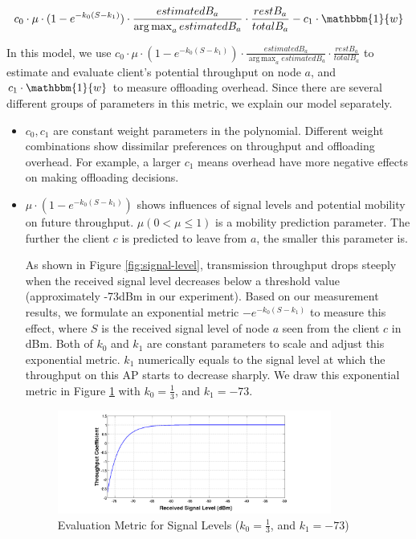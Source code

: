 \documentclass[english]{tktltiki}
\begin{document}
\begin{enumerate}
\begin{equation} \label{eq:offloading}
  c_0 \cdot \mu \cdot (1 - e^{-k_0(S - k_1)}) \cdot  \frac{estimatedB_a}{\operatorname*{arg\,max}_a estimatedB_a} \cdot \frac{restB_a}{totalB_a} - c_1 \cdot \mathbbm{1}{w}
\end{equation}

In this model, we use $c_0 \cdot \mu \cdot (1 - e^{-k_0(S - k_1)}) \cdot  \frac{estimatedB_a}{\operatorname*{arg\,max}_a estimatedB_a} \cdot \frac{restB_a}{totalB_a}$ to estimate and evaluate client's potential throughput on node $a$, and $c_1 \cdot \mathbbm{1}{w}$ to measure offloading overhead. Since there are several different groups of parameters in this metric, we explain our model separately.


\begin{itemize}
  \item $c_0, c_1$ are constant weight parameters in the polynomial. Different weight combinations show dissimilar preferences on throughput and offloading overhead. For example, a larger $c_1$ means overhead have more negative effects on making offloading decisions.

  \item $\mu \cdot (1 - e^{-k_0(S - k_1)})$ shows influences of signal levels and potential mobility on future throughput. $\mu(0<\mu\leq 1)$ is a mobility prediction parameter. The further the client $c$ is predicted to leave from $a$, the smaller this parameter is.

As shown in Figure \ref{fig:signal-level}, transmission throughput drops steeply when the received signal level decreases below a threshold value (approximately -73dBm in our experiment). Based on our measurement results, we formulate an exponential metric $- e^{-k_0(S - k_1)}$ to measure this effect, where $S$ is the received signal level of node $a$ seen from the client $c$ in dBm. Both of $k_0$ and $k_1$ are constant parameters to scale and adjust this exponential metric. $k_1$ numerically equals to the signal level at which the throughput on this AP starts to decrease sharply. We draw this exponential metric in Figure \ref{fig:model} with $k_0 = \frac{1}{3}$, and $k_1 = -73$.
  
\begin{figure}[htbp]
  \centering
  \includegraphics[width=0.85\textwidth]{images/model.png}
  \caption{Evaluation Metric for Signal Levels ($k_0 = \frac{1}{3}$, and $k_1 = -73$)}
  \label{fig:model}
\end{figure}  
  

\end{itemize}
\end{enumerate}
\end{document}
